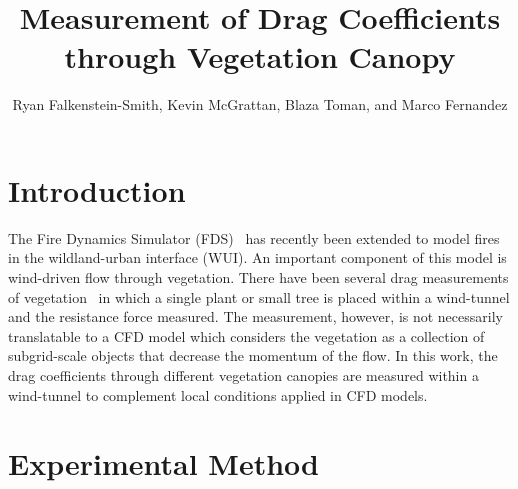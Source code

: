 \documentclass[a4paper,11pt]{article}
\title{\vspace{-2.0cm}\textbf{Measurement of Drag Coefficients through Vegetation Canopy} }
\author{Ryan Falkenstein-Smith, Kevin McGrattan, Blaza Toman, and Marco Fernandez}
\affil{National Institute of Standards and Technology \\ Gaithersburg, Maryland, USA}
\date{\vspace{-5ex}}
\begin{document}
\maketitle
\thispagestyle{empty}

\section{Introduction}

The Fire Dynamics Simulator (FDS)~\cite{FDS_Tech_Guide} has recently been extended to model fires in the wildland-urban interface (WUI). An important component of this model is wind-driven flow through vegetation. There have been several drag measurements of vegetation~\cite{Cao2012,Jalonen2014,Mayhead1973} in which a single plant or small tree is placed within a wind-tunnel and the resistance force measured. The measurement, however, is not necessarily translatable to a CFD model which considers the vegetation as a collection of subgrid-scale objects that decrease the momentum of the flow. In this work, the drag coefficients through different vegetation canopies are measured within a wind-tunnel to complement local conditions applied in CFD models.

\section{Experimental Method}
\end{document}

